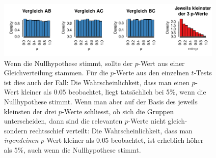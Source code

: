 \documentclass[oneside, 10pt]{book}\usepackage[]{graphicx}\usepackage[]{xcolor}
\newenvironment{knitrout}{}{} %
\begin{document}
\begin{knitrout}
\color{fgcolor}\begin{figure}[tp]

{\centering \includegraphics[width=\textwidth]{figs/unnamed-chunk-380-1} 

}

\caption{Wenn die Nullhypothese stimmt, sollte der $p$-Wert aus einer Gleichverteilung stammen. Für die $p$-Werte aus den einzelnen $t$-Tests ist dies auch der Fall: Die Wahrscheinlichkeit, dass man einen $p$-Wert kleiner als 0.05 beobachtet, liegt tatsächlich bei 5\%, wenn die Nullhypothese stimmt. Wenn man aber auf der Basis des jeweils kleinsten der drei $p$-Werte schliesst, ob sich die Gruppen unterscheiden, dann sind die relevanten $p$-Werte nicht gleich- sondern rechtsschief verteilt: Die Wahrscheinlichkeit, dass man \emph{irgendeinen} $p$-Wert kleiner als 0.05 beobachtet, ist erheblich höher als 5\%, auch wenn die Nullhypothese stimmt.\label{fig:anova_pvalues}}\label{fig:unnamed-chunk-380}
\end{figure}

\end{knitrout}
\end{document}
